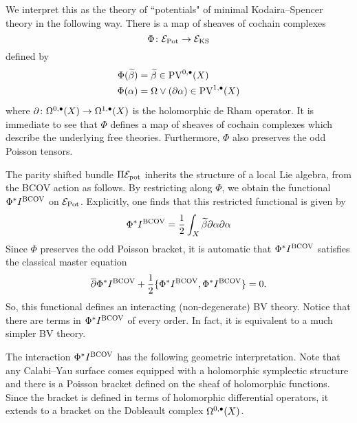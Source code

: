 \documentclass[11pt]{amsart}
\def\PV{{\rm PV}}
\begin{document}
We interpret this as the theory of  ``potentials"  of minimal Kodaira--Spencer theory in the following way.
There is a map of sheaves of cochain complexes
\[
\Phi \colon \cE_{\rm Pot} \to \cE_{\rm KS}
\]
defined by
\begin{align*}
\Phi (\Tilde{\beta}) & = \Tilde{\beta} \in \PV^{0,\bu}(X) \\
\Phi(\alpha) & = \Omega \vee (\partial \alpha) \in \PV^{1,\bu}(X)
\end{align*}
where $\partial \colon \Omega^{0,\bu}(X) \to \Omega^{1,\bu}(X)$ is the holomorphic de Rham operator. 
It is immediate to see that $\Phi$ defines a map of sheaves of cochain complexes which describe the underlying free theories. 
Furthermore, $\Phi$ also preserves the odd Poisson tensors. 


The parity shifted bundle $\Pi \cE_{\rm pot}$ inherits the structure of a local Lie algebra, from the BCOV action as follows. 
By restricting along $\Phi$, we obtain the functional $\Phi^* I^{\rm BCOV}$ on $\cE_{\rm Pot}$. 
Explicitly, one finds that this restricted functional is given by
\[
\Phi^* I^{\rm BCOV} = \frac12 \int_{X} \Tilde{\beta} \partial \alpha \partial \alpha 
\]
Since $\Phi$ preserves the odd Poisson bracket, it is automatic that $\Phi^* I^{\rm BCOV}$ satisfies the classical master equation
\[
\dbar \Phi^* I^{\rm BCOV} + \frac12 \{\Phi^* I^{\rm BCOV} , \Phi^* I^{\rm BCOV} \} = 0 .
\]
So, this functional defines an interacting (non-degenerate) BV theory. 
Notice that there are terms in $\Phi^* I^{\rm BCOV}$ of every order.
In fact, it is equivalent to a much simpler BV theory. 


The interaction $\Phi^*I^{\rm BCOV}$ has the following geometric interpretation. 
Note that any Calabi--Yau surface comes equipped with a holomorphic symplectic structure and there is a Poisson bracket defined on the sheaf of holomorphic functions.
Since the bracket is defined in terms of holomorphic differential operators, it extends to a bracket on the Dobleault complex $\Omega^{0,\bu}(X)$.
\end{document}
